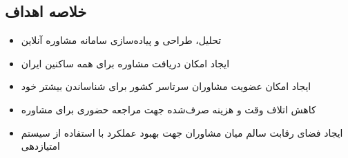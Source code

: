 \subsection{خلاصه اهداف}
\begin{itemize}
\item تحلیل، طراحی و پیاده‌سازی سامانه مشاوره آنلاین
\item ایجاد امکان دریافت مشاوره برای همه ساکنین ایران
\item ایجاد امکان عضویت مشاوران سرتاسر کشور برای شناساندن بیشتر خود
\item کاهش اتلاف وقت و هزینه صرف‌شده جهت مراجعه حضوری برای مشاوره
\item ایجاد فضای رقابت سالم میان مشاوران جهت بهبود عملکرد با استفاده از سیستم امتیازدهی
\end{itemize}